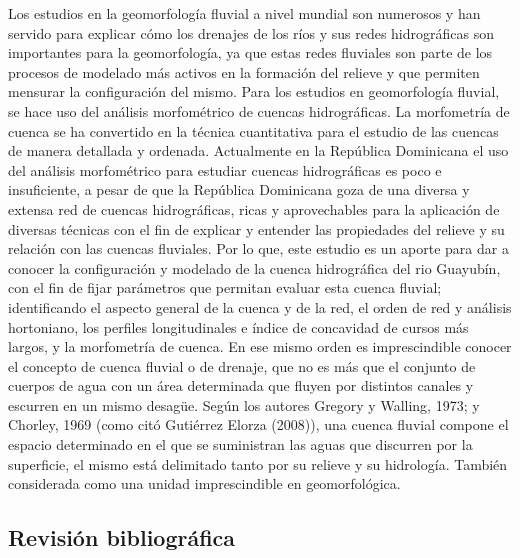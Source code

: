 \documentclass[11pt,]{article}
\begin{document}
Los estudios en la geomorfología fluvial a nivel mundial son numerosos y
han servido para explicar cómo los drenajes de los ríos y sus redes
hidrográficas son importantes para la geomorfología, ya que estas redes
fluviales son parte de los procesos de modelado más activos en la
formación del relieve y que permiten mensurar la configuración del
mismo. Para los estudios en geomorfología fluvial, se hace uso del
análisis morfométrico de cuencas hidrográficas. La morfometría de cuenca
se ha convertido en la técnica cuantitativa para el estudio de las
cuencas de manera detallada y ordenada. Actualmente en la República
Dominicana el uso del análisis morfométrico para estudiar cuencas
hidrográficas es poco e insuficiente, a pesar de que la República
Dominicana goza de una diversa y extensa red de cuencas hidrográficas,
ricas y aprovechables para la aplicación de diversas técnicas con el fin
de explicar y entender las propiedades del relieve y su relación con las
cuencas fluviales. Por lo que, este estudio es un aporte para dar a
conocer la configuración y modelado de la cuenca hidrográfica del rio
Guayubín, con el fin de fijar parámetros que permitan evaluar esta
cuenca fluvial; identificando el aspecto general de la cuenca y de la
red, el orden de red y análisis hortoniano, los perfiles longitudinales
e índice de concavidad de cursos más largos, y la morfometría de cuenca.
En ese mismo orden es imprescindible conocer el concepto de cuenca
fluvial o de drenaje, que no es más que el conjunto de cuerpos de agua
con un área determinada que fluyen por distintos canales y escurren en
un mismo desagüe. Según los autores Gregory y Walling, 1973; y Chorley,
1969 (como citó Gutiérrez Elorza (2008)), una cuenca fluvial compone el
espacio determinado en el que se suministran las aguas que discurren por
la superficie, el mismo está delimitado tanto por su relieve y su
hidrología. También considerada como una unidad imprescindible en
geomorfológica.

\subsection{Revisión bibliográfica}\label{revisiuxf3n-bibliogruxe1fica}
\end{document}
